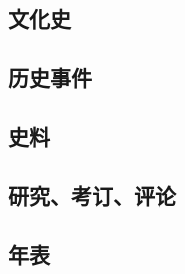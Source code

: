 \documentclass[UTF8]{../RepresentationUniverse}
\begin{document}
    \subsection{文化史}


    \subsection{历史事件}
    \subsection{史料}
    \subsection{研究、考订、评论}
    \subsection{年表}
\end{document}
